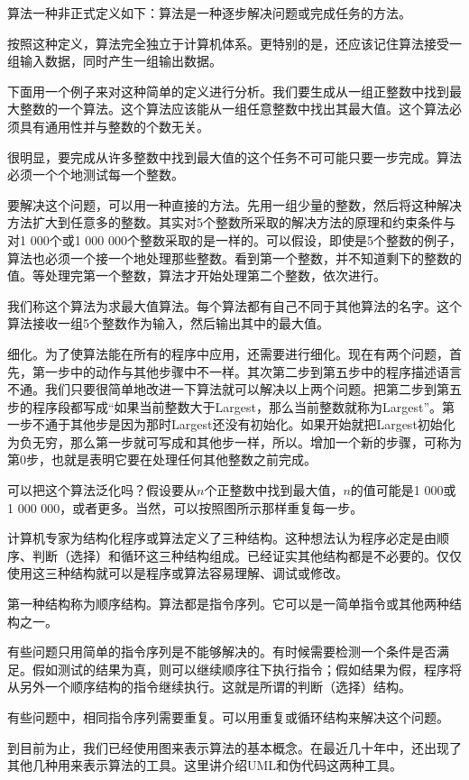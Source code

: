 算法一种非正式定义如下：算法是一种逐步解决问题或完成任务的方法。

按照这种定义，算法完全独立于计算机体系。更特别的是，还应该记住算法接受一组输入数据，同时产生一组输出数据。

下面用一个例子来对这种简单的定义进行分析。我们要生成从一组正整数中找到最大整数的一个算法。这个算法应该能从一组任意整数中找出其最大值。这个算法必须具有通用性并与整数的个数无关。

很明显，要完成从许多整数中找到最大值的这个任务不可可能只要一步完成。算法必须一个个地测试每一个整数。

要解决这个问题，可以用一种直接的方法。先用一组少量的整数，然后将这种解决方法扩大到任意多的整数。其实对5个整数所采取的解决方法的原理和约束条件与对1 000个或1 000 000个整数采取的是一样的。可以假设，即使是5个整数的例子，算法也必须一个接一个地处理那些整数。看到第一个整数，并不知道剩下的整数的值。等处理完第一个整数，算法才开始处理第二个整数，依次进行。

我们称这个算法为求最大值算法。每个算法都有自己不同于其他算法的名字。这个算法接收一组5个整数作为输入，然后输出其中的最大值。

细化。为了使算法能在所有的程序中应用，还需要进行细化。现在有两个问题，首先，第一步中的动作与其他步骤中不一样。其次第二步到第五步中的程序描述语言不通。我们只要很简单地改进一下算法就可以解决以上两个问题。把第二步到第五步的程序段都写成“如果当前整数大于Largest，那么当前整数就称为Largest”。第一步不通于其他步是因为那时Largest还没有初始化。如果开始就把Largest初始化为负无穷，那么第一步就可写成和其他步一样，所以。增加一个新的步骤，可称为第0步，也就是表明它要在处理任何其他整数之前完成。

可以把这个算法泛化吗？假设要从$n$个正整数中找到最大值，$n$的值可能是1 000或1 000 000，或者更多。当然，可以按照图所示那样重复每一步。

计算机专家为结构化程序或算法定义了三种结构。这种想法认为程序必定是由顺序、判断（选择）和循环这三种结构组成。已经证实其他结构都是不必要的。仅仅使用这三种结构就可以是程序或算法容易理解、调试或修改。

第一种结构称为顺序结构。算法都是指令序列。它可以是一简单指令或其他两种结构之一。

有些问题只用简单的指令序列是不能够解决的。有时候需要检测一个条件是否满足。假如测试的结果为真，则可以继续顺序往下执行指令；假如结果为假，程序将从另外一个顺序结构的指令继续执行。这就是所谓的判断（选择）结构。

有些问题中，相同指令序列需要重复。可以用重复或循环结构来解决这个问题。

到目前为止，我们已经使用图来表示算法的基本概念。在最近几十年中，还出现了其他几种用来表示算法的工具。这里讲介绍UML和伪代码这两种工具。

